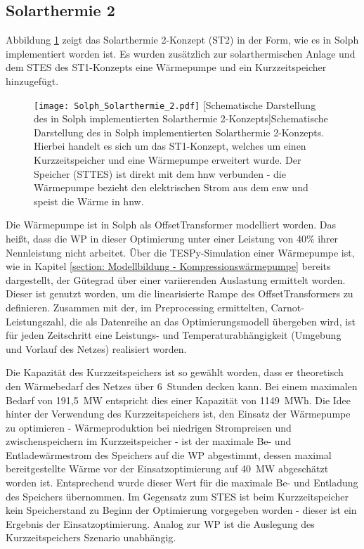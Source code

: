 \subsection{Solarthermie 2}
Abbildung \ref{figure: Solph_Solarthermie_2} zeigt das Solarthermie 2-Konzept (ST2) in der Form, wie es in Solph implementiert worden ist. Es wurden zusätzlich zur solarthermischen Anlage und dem \ac{STES} des ST1-Konzepts eine Wärmepumpe und ein Kurzzeitspeicher hinzugefügt.
	\begin{figure}[ht]
		\centering
		\texttt{[image: Solph\_Solarthermie\_2.pdf]}
		[Schematische Darstellung des in Solph implementierten Solarthermie 2-Konzepts]{Schematische Darstellung des in Solph implementierten Solarthermie 2-Konzepts. Hierbei handelt es sich um das ST1-Konzept, welches um einen Kurzzeitspeicher und eine Wärmepumpe erweitert wurde. Der Speicher (STTES) ist direkt mit dem hnw verbunden - die Wärmepumpe bezieht den elektrischen Strom aus dem enw und speist die Wärme in hnw.}
		\label{figure: Solph_Solarthermie_2}
	\end{figure}

Die Wärmepumpe ist in Solph als OffsetTransformer modelliert worden. Das heißt, dass die \ac{WP} in dieser Optimierung unter einer Leistung von 40\% ihrer Nennleistung nicht arbeitet. Über die \ac{TESPy}-Simulation einer Wärmepumpe ist, wie in Kapitel \ref{section: Modellbildung - Kompressionswärmepumpe} bereits dargestellt, der Gütegrad über einer variierenden Auslastung ermittelt worden. Dieser ist genutzt worden, um die linearisierte Rampe des OffsetTransformers zu definieren. Zusammen mit der, im Preprocessing ermittelten, Carnot-Leistungszahl, die als Datenreihe an das Optimierungsmodell übergeben wird, ist für jeden Zeitschritt eine Leistungs- und Temperaturabhängigkeit (Umgebung und Vorlauf des Netzes) realisiert worden.

Die Kapazität des Kurzzeitspeichers ist so gewählt worden, dass er theoretisch den Wärmebedarf des Netzes über 6~Stunden decken kann. Bei einem maximalen Bedarf von 191,5~MW entspricht dies einer Kapazität von 1149~MWh. Die Idee hinter der Verwendung des Kurzzeitspeichers ist, den Einsatz der Wärmepumpe zu optimieren - Wärmeproduktion bei niedrigen Strompreisen und zwischenspeichern im Kurzzeitspeicher - ist der maximale Be- und Entladewärmestrom des Speichers auf die \ac{WP} abgestimmt, dessen maximal bereitgestellte Wärme vor der Einsatzoptimierung auf 40~MW abgeschätzt worden ist. Entsprechend wurde dieser Wert für die maximale Be- und Entladung des Speichers übernommen. Im Gegensatz zum \ac{STES} ist beim Kurzzeitspeicher kein Speicherstand zu Beginn der Optimierung vorgegeben worden - dieser ist ein Ergebnis der Einsatzoptimierung. Analog zur \ac{WP} ist die Auslegung des Kurzzeitspeichers Szenario unabhängig. 

